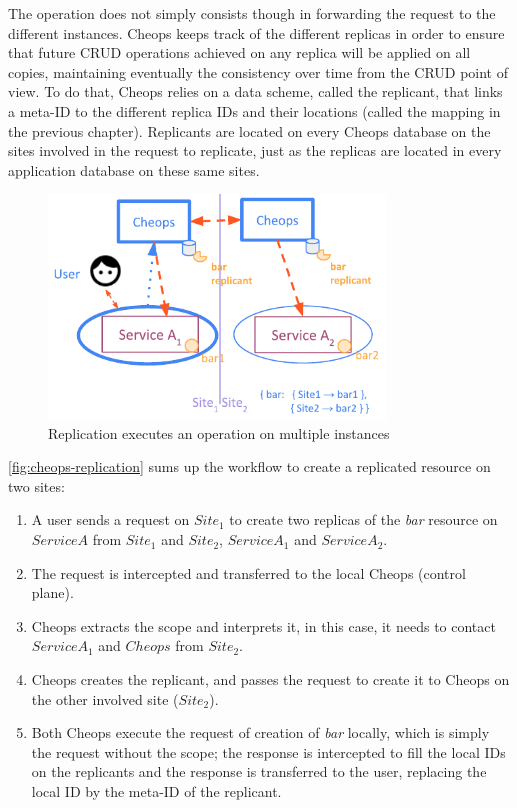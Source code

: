 The operation does not simply consists though in forwarding the
request to the different instances.
%
Cheops keeps track of the different replicas in order to ensure that
future CRUD operations achieved on any replica will be applied on all
copies, maintaining eventually the consistency over time from the CRUD
point of view.
%
To do that, Cheops relies on a data scheme, called the replicant, that
links a meta-ID to the different replica IDs and their locations
(called the mapping in the previous chapter).
%
Replicants are located on every Cheops database on the sites involved
in the request to replicate, just as the replicas are located in every
application database on these same sites.


\begin{figure}
  \centering
  \includegraphics[width=0.8\textwidth]{figs/pdf/cheops-replication}
  \caption{Replication executes an operation on multiple instances}
  \label{fig:cheops-replication}
\end{figure}

\autoref{fig:cheops-replication} sums up the workflow to create a
replicated resource on two sites:

\begin{enumerate}
\item A user sends a request on $Site_1$ to create two replicas of the
  \emph{bar} resource on $Service A$ from $Site_1$ and $Site_2$, \ie
  $Service A_1$ and $Service A_2$.
\item The request is intercepted and transferred to the local Cheops
  (control plane).
\item Cheops extracts the scope and interprets it, in this case, it
  needs to contact $Service A_1$ and $Cheops$ from $Site_2$.
\item Cheops creates the replicant, and passes the request to create
  it to Cheops on the other involved site ($Site_2$).
\item Both Cheops execute the request of creation of \emph{bar}
  locally, which is simply the request without the scope; the response
  is intercepted to fill the local IDs on the replicants and the
  response is transferred to the user, replacing the local ID by the
  meta-ID of the replicant.
\end{enumerate}

